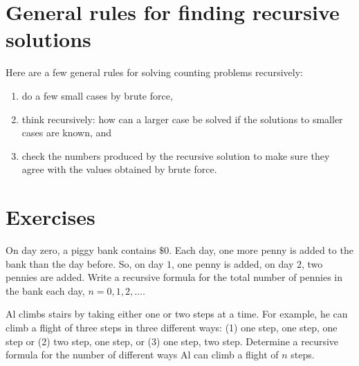 \section{General rules for finding recursive solutions}
Here are a few general rules for solving counting problems recursively: 
\begin{enumerate}
 \item do a few small cases by brute force,
 \item think recursively: how can a larger case be solved if 
       the solutions to smaller cases are known, and  
 \item check the numbers produced by the
       recursive solution to make sure they agree with the values obtained by brute force.
\end{enumerate}



\clearpage
\section{Exercises}

\begin{exer}
On day zero, a piggy bank contains $\$0$. Each day, one more penny is added to the bank than the day before.
So, on day $1$, one penny is added, on day $2$, two pennies are added. Write a recursive formula for the total 
number of pennies in the bank each day, $n = 0,1,2,\ldots$.
\end{exer}



\begin{exer}
Al climbs stairs by taking either one or two steps at a time. For example, he can climb a flight of three steps in three different ways: (1) one step, one step, one step or 
(2) two step, one step, or (3) one step, two step. Determine a recursive formula for the number of different ways Al can climb a flight of $n$ steps.
\end{exer}
%
%
%
%




